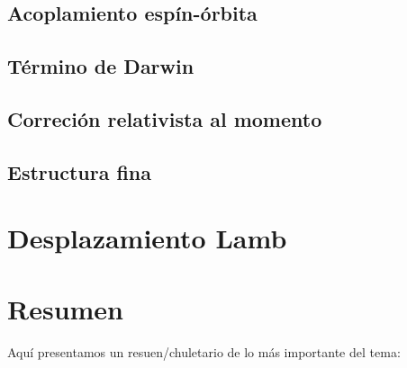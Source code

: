 \subsection{Acoplamiento espín-órbita}

\subsection{Término de Darwin}

\subsection{Correción relativista al momento}

\subsection{Estructura fina}

\section{Desplazamiento Lamb}

\section{Resumen}

Aquí presentamos un resuen/chuletario de lo más importante del tema: